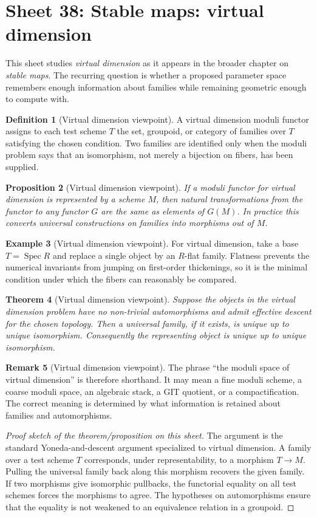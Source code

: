 \documentclass[11pt]{amsart}
\newtheorem{theorem}{Theorem}[section]
\newtheorem{proposition}[theorem]{Proposition}
\theoremstyle{definition}
\newtheorem{definition}[theorem]{Definition}
\newtheorem{example}[theorem]{Example}
\newtheorem{remark}[theorem]{Remark}
\newcommand{\Spec}{\operatorname{Spec}}
\begin{document}
\section{Sheet 38: Stable maps: virtual dimension}
This sheet studies \emph{virtual dimension} as it appears in the broader chapter on \emph{stable maps}.  The recurring question is whether a proposed parameter space remembers enough information about families while remaining geometric enough to compute with.
\begin{definition}[Virtual dimension viewpoint]
A virtual dimension moduli functor assigns to each test scheme $T$ the set, groupoid, or category of families over $T$ satisfying the chosen condition.  Two families are identified only when the moduli problem says that an isomorphism, not merely a bijection on fibers, has been supplied.
\end{definition}
\begin{proposition}[Virtual dimension viewpoint]
If a moduli functor for virtual dimension is represented by a scheme $M$, then natural transformations from the functor to any functor $G$ are the same as elements of $G(M)$.  In practice this converts universal constructions on families into morphisms out of $M$.
\end{proposition}
\begin{example}[Virtual dimension viewpoint]
For virtual dimension, take a base $T=\Spec R$ and replace a single object by an $R$-flat family.  Flatness prevents the numerical invariants from jumping on first-order thickenings, so it is the minimal condition under which the fibers can reasonably be compared.
\end{example}
\begin{theorem}[Virtual dimension viewpoint]
Suppose the objects in the virtual dimension problem have no non-trivial automorphisms and admit effective descent for the chosen topology.  Then a universal family, if it exists, is unique up to unique isomorphism.  Consequently the representing object is unique up to unique isomorphism.
\end{theorem}
\begin{remark}[Virtual dimension viewpoint]
The phrase ``the moduli space of virtual dimension'' is therefore shorthand.  It may mean a fine moduli scheme, a coarse moduli space, an algebraic stack, a GIT quotient, or a compactification.  The correct meaning is determined by what information is retained about families and automorphisms.
\end{remark}
\begin{proof}[Proof sketch of the theorem/proposition on this sheet]
The argument is the standard Yoneda-and-descent argument specialized to virtual dimension.  A family over a test scheme $T$ corresponds, under representability, to a morphism $T\to M$.  Pulling the universal family back along this morphism recovers the given family.  If two morphisms give isomorphic pullbacks, the functorial equality on all test schemes forces the morphisms to agree.  The hypotheses on automorphisms ensure that the equality is not weakened to an equivalence relation in a groupoid.
\end{proof}
\end{document}
